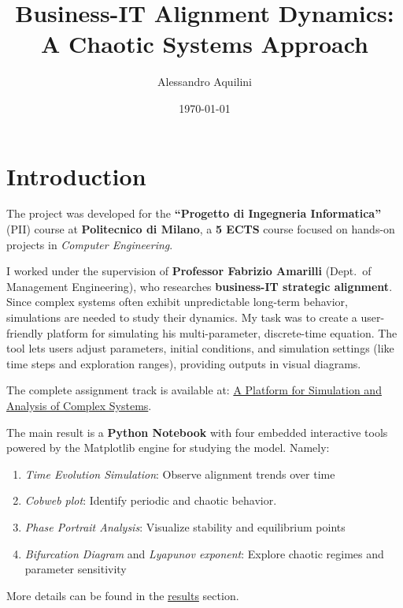 \documentclass[a4paper, 10pt]{article}
\title{Business-IT Alignment Dynamics: A Chaotic Systems Approach}
\author{Alessandro Aquilini}
\date{\today}
\begin{document}
\raggedright 

\maketitle

\tableofcontents

\clearpage

\section{Introduction}
The project was developed for the \textbf{``Progetto di Ingegneria Informatica''} (PII) course at \textbf{Politecnico di Milano}, a \textbf{5 ECTS} course focused on hands-on projects in \textit{Computer Engineering}.

I worked under the supervision of \textbf{Professor Fabrizio Amarilli} (Dept.\ of Management Engineering), who researches \textbf{business-IT strategic alignment}. Since complex systems often exhibit unpredictable long-term behavior, simulations are needed to study their dynamics. \newline
My task was to create a user-friendly platform for simulating his multi-parameter, discrete-time equation. The tool lets users adjust parameters, initial conditions, and simulation settings (like time steps and exploration ranges), providing outputs in visual diagrams.

The complete assignment track is available at: 
\href{https://pii.deib.polimi.it/a-platform-for-simulation-and-analysis-of-complex-systems/}{A Platform for Simulation and Analysis of Complex Systems}.

The main result is a \textbf{Python Notebook} with four embedded interactive tools powered by the Matplotlib engine for studying the model. Namely:

\begin{enumerate}
    \item \textit{Time Evolution Simulation}: Observe alignment trends over time
    \item \textit{Cobweb plot}: Identify periodic and chaotic behavior.
    \item \textit{Phase Portrait Analysis}: Visualize stability and equilibrium points
    \item \textit{Bifurcation Diagram} and \textit{Lyapunov exponent}: Explore chaotic regimes and parameter sensitivity
\end{enumerate}

More details can be found in the \hyperref[sec:results]{results} section.
\end{document}
